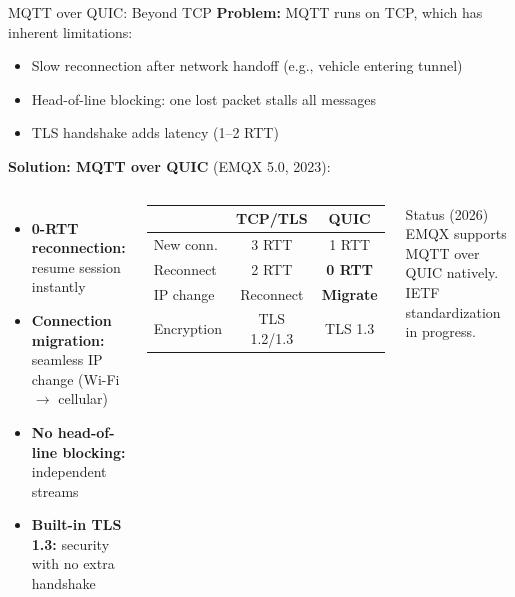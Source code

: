 \documentclass[aspectratio=169,11pt]{beamer}
\begin{document}
\begin{frame}{MQTT over QUIC: Beyond TCP}
    \textbf{Problem:} MQTT runs on TCP, which has inherent limitations:
    \begin{itemize}
        \item Slow reconnection after network handoff (e.g., vehicle entering tunnel)
        \item Head-of-line blocking: one lost packet stalls all messages
        \item TLS handshake adds latency (1--2 RTT)
    \end{itemize}
    
    \vspace{0.15cm}
    \textbf{Solution: MQTT over QUIC} (EMQX 5.0, 2023):
    
    \begin{columns}
        \begin{itemize}
            \item \textbf{0-RTT reconnection:} resume session instantly
            \item \textbf{Connection migration:} seamless IP change (Wi-Fi $\rightarrow$ cellular)
            \item \textbf{No head-of-line blocking:} independent streams
            \item \textbf{Built-in TLS 1.3:} security with no extra handshake
        \end{itemize}
        
        \begin{center}
        \begin{tabular}{lcc}
            \toprule
            & \textbf{TCP/TLS} & \textbf{QUIC} \\
            \midrule
            New conn. & 3 RTT & 1 RTT \\
            Reconnect & 2 RTT & \textbf{0 RTT} \\
            IP change & Reconnect & \textbf{Migrate} \\
            Encryption & TLS 1.2/1.3 & TLS 1.3 \\
            \bottomrule
        \end{tabular}
        \end{center}
        
        \begin{alertblock}{Status (2026)}
            EMQX supports MQTT over QUIC natively. IETF standardization in progress.
        \end{alertblock}
    \end{columns}
\end{frame}
\end{document}
